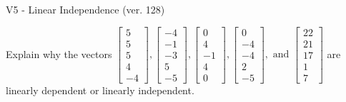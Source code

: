 \begin{exercise}
  \begin{exerciseTitle}V5 - Linear Independence (ver. 128)\end{exerciseTitle}
  \begin{exerciseStatement}
    Explain why the vectors \(\left[\begin{array}{r}
5 \\
5 \\
5 \\
4 \\
-4
\end{array}\right] , \left[\begin{array}{r}
-4 \\
-1 \\
-3 \\
5 \\
-5
\end{array}\right] , \left[\begin{array}{r}
0 \\
4 \\
-1 \\
4 \\
0
\end{array}\right] , \left[\begin{array}{r}
0 \\
-4 \\
-4 \\
2 \\
-5
\end{array}\right] , \text{ and } \left[\begin{array}{r}
22 \\
21 \\
17 \\
1 \\
7
\end{array}\right]\) are linearly dependent or linearly independent.	



\end{exerciseStatement}
\end{exercise}
